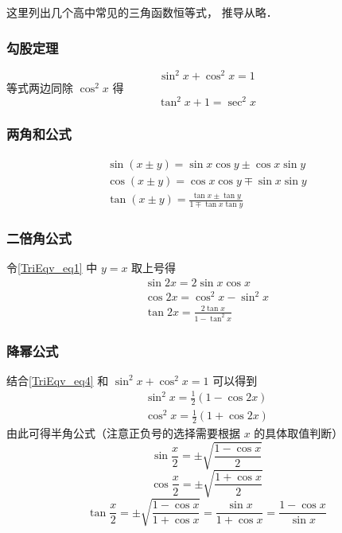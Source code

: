 

这里列出几个高中常见的三角函数恒等式， 推导从略．

\subsubsection{勾股定理}

\begin{equation}
\sin^2 x + \cos^2 x = 1
\end{equation}
等式两边同除 $\cos^2 x$ 得
\begin{equation}\label{TriEqv_eq13}
\tan^2 x + 1 = \sec^2 x
\end{equation}

\subsubsection{两角和公式}
\begin{gather}\label{TriEqv_eq1}
\sin(x\pm y) = \sin x\cos y \pm \cos x\sin y\\
\label{TriEqv_eq2}
\cos(x\pm y) = \cos x\cos y \mp \sin x\sin y\\
\tan(x\pm y) = \frac{\tan x \pm \tan y}{1 \mp \tan x \tan y}
\end{gather}

\subsubsection{二倍角公式}

令\autoref{TriEqv_eq1} 中 $y=x$ 取上号得
\begin{gather}
\sin 2x = 2\sin x\cos x\\
\label{TriEqv_eq4}
\cos 2x = \cos^2 x - \sin^2 x\\
\tan 2x = \frac{2\tan x}{1 - \tan^2 x}
\end{gather}

\subsubsection{降幂公式}

结合\autoref{TriEqv_eq4} 和 $\sin^2 x + \cos^2 x = 1$ 可以得到
\begin{gather}
\sin^2 x = \frac12 (1- \cos 2x) \label{TriEqv_eq5} \\
\cos^2 x = \frac12 (1+\cos 2x) \label{TriEqv_eq6}
\end{gather}
由此可得半角公式（注意正负号的选择需要根据 $x$ 的具体取值判断）
\begin{equation}
\sin\frac{ x}{2} = \pm\sqrt{\frac{1-\cos x}{2}}
\end{equation}
\begin{equation}
\cos\frac{ x}{2}= \pm\sqrt{\frac{1+\cos x}{2}}
\end{equation}
\begin{equation}
\tan\frac{ x}{2} = \pm\sqrt{\frac{1-\cos x}{1+\cos x}} = \frac{\sin x}{1+\cos x} = \frac{1-\cos x}{\sin x}
\end{equation}

